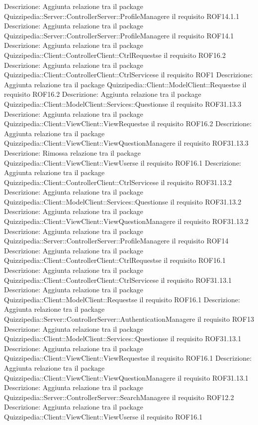 Descrizione: Aggiunta relazione tra il package Quizzipedia::Server::ControllerServer::ProfileManagere il requisito ROF14.1.1 
Descrizione: Aggiunta relazione tra il package Quizzipedia::Server::ControllerServer::ProfileManagere il requisito ROF14.1 
Descrizione: Aggiunta relazione tra il package Quizzipedia::Client::ControllerClient::CtrlRequestse il requisito ROF16.2 
Descrizione: Aggiunta relazione tra il package Quizzipedia::Client::ControllerClient::CtrlServicese il requisito ROF1 
Descrizione: Aggiunta relazione tra il package Quizzipedia::Client::ModelClient::Requestse il requisito ROF16.2 
Descrizione: Aggiunta relazione tra il package Quizzipedia::Client::ModelClient::Services::Questionse il requisito ROF31.13.3 
Descrizione: Aggiunta relazione tra il package Quizzipedia::Client::ViewClient::ViewRequestse il requisito ROF16.2 
Descrizione: Aggiunta relazione tra il package Quizzipedia::Client::ViewClient::ViewQuestionManagere il requisito ROF31.13.3 
Descrizione: Rimossa relazione tra il package Quizzipedia::Client::ViewClient::ViewUserse il requisito ROF16.1 
Descrizione: Aggiunta relazione tra il package Quizzipedia::Client::ControllerClient::CtrlServicese il requisito ROF31.13.2 
Descrizione: Aggiunta relazione tra il package Quizzipedia::Client::ModelClient::Services::Questionse il requisito ROF31.13.2 
Descrizione: Aggiunta relazione tra il package Quizzipedia::Client::ViewClient::ViewQuestionManagere il requisito ROF31.13.2 
Descrizione: Aggiunta relazione tra il package Quizzipedia::Server::ControllerServer::ProfileManagere il requisito ROF14 
Descrizione: Aggiunta relazione tra il package Quizzipedia::Client::ControllerClient::CtrlRequestse il requisito ROF16.1 
Descrizione: Aggiunta relazione tra il package Quizzipedia::Client::ControllerClient::CtrlServicese il requisito ROF31.13.1 
Descrizione: Aggiunta relazione tra il package Quizzipedia::Client::ModelClient::Requestse il requisito ROF16.1 
Descrizione: Aggiunta relazione tra il package Quizzipedia::Server::ControllerServer::AuthenticationManagere il requisito ROF13 
Descrizione: Aggiunta relazione tra il package Quizzipedia::Client::ModelClient::Services::Questionse il requisito ROF31.13.1 
Descrizione: Aggiunta relazione tra il package Quizzipedia::Client::ViewClient::ViewRequestse il requisito ROF16.1 
Descrizione: Aggiunta relazione tra il package Quizzipedia::Client::ViewClient::ViewQuestionManagere il requisito ROF31.13.1 
Descrizione: Aggiunta relazione tra il package Quizzipedia::Server::ControllerServer::SearchManagere il requisito ROF12.2 
Descrizione: Aggiunta relazione tra il package Quizzipedia::Client::ViewClient::ViewUserse il requisito ROF16.1 
